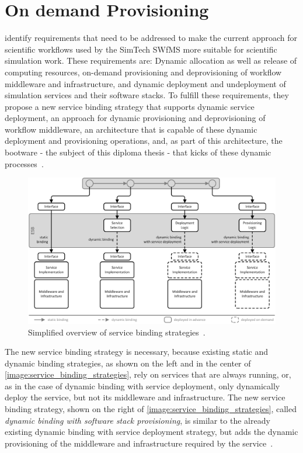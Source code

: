 \section{On demand Provisioning}
\label{related:ondemand}

\citeauthor{provisioning:ondemand} identify requirements that need to be addressed to make the current approach for scientific workflows used by the SimTech SWfMS more suitable for scientific simulation work. These requirements are: Dynamic allocation as well as release of computing resources, on-demand provisioning and deprovisioning of workflow middleware and infrastructure, and dynamic deployment and undeployment of simulation services and their software stacks. To fulfill these requirements, they propose a new service binding strategy that supports dynamic service deployment, an approach for dynamic provisioning and deprovisioning of workflow middleware, an architecture that is capable of these dynamic deployment and provisioning operations, and, as part of this architecture, the bootware - the subject of this diploma thesis - that kicks of these dynamic processes~\autocite{provisioning:ondemand}.

\begin{figure}[!htbp]
	\centering
	\includegraphics[resolution=600]{related/assets/service_binding_strategies}
	\caption{Simplified overview of service binding strategies~\autocite[based on][]{provisioning:ondemand}.}
	\label{image:service_binding_strategies}
\end{figure}

The new service binding strategy is necessary, because existing static and dynamic binding strategies, as shown on the left and in the center of \autoref{image:service_binding_strategies}, rely on services that are always running, or, as in the case of dynamic binding with service deployment, only dynamically deploy the service, but not its middleware and infrastructure. The new service binding strategy, shown on the right of \autoref{image:service_binding_strategies}, called \textit{dynamic binding with software stack provisioning}, is similar to the already existing dynamic binding with service deployment strategy, but adds the dynamic provisioning of the middleware and infrastructure required by the service~\autocite{provisioning:ondemand}.

